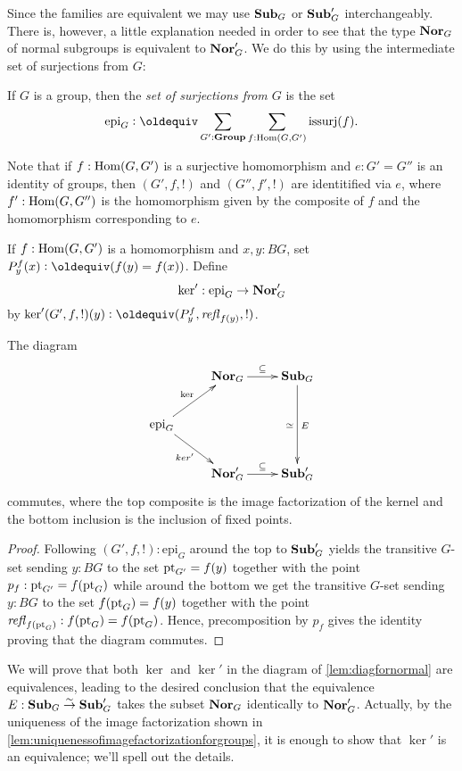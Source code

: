 Since the families are equivalent we may use $\mathbf{Sub}_G$ or $\mathbf{Sub}_G'$ interchangeably.  
There is, however, a little explanation needed in order to see that the type $\mathbf{Nor}_G$ of normal subgroups is equivalent to $\mathbf{Nor}'_G$.
We do this by using the intermediate set of surjections from $G$:
\newcommand{\epi}{\mathrm{epi}}
\begin{definition}
  \label{def:typeepi}
  If $G$ is a group, then the \emph{set of surjections from $G$} is the set
$$\epi_G\defequi\sum_{G':\typegroup}\sum_{f:\Hom(G,G')}\mathrm{issurj}(f).$$
\end{definition}
Note that if $f:\mathrm{Hom}(G,G')$ is a surjective homomorphism and $e:G'=G''$ is an identity of groups, then $(G',f,!)$ and $(G'',f',!)$ are identitified via $e$, where $f':\mathrm{Hom}(G,G'')$ is the homomorphism given by the composite of $f$ and the homomorphism corresponding to $e$.

\begin{definition}
  \label{def:ker2}
  If $f:\mathrm{Hom}(G,G')$ is a homomorphism and $x,y:BG$, set $P^f_y(x)\defequi (f(y)=f(x))$.
  Define $$\ker':\epi_G\to\typenormal_G'$$
  by $\ker'(G',f,!)(y)\defequi(P^f_y,\refl{f(y)},!)$.
\end{definition}

\begin{lemma}
  \label{lem:diagfornormal}
  The diagram
  $$\xymatrix{
  &\typenormal_G\ar[r]^{\subseteq}&\typesubgroup_G\ar[dd]_{\simeq}^{E}\\
  \epi_G\ar[ur]^{\ker}\ar[dr]_{ker'}&&\\
  &\typenormal_G'\ar[r]^{\subseteq}&\typesubgroup_G'}
$$
commutes, where the top composite is the image factorization of the kernel and the bottom inclusion is the inclusion of fixed points.
\end{lemma}
\begin{proof}
  Following $(G',f,!):\epi_G$ around the top to $\mathbf{Sub}_G'$ yields the transitive $G$-set sending $y:BG$ to the set $\mathrm{pt}_{G'}=f(y)$ together with the point $p_f:\mathrm{pt}_{G'}=f(\mathrm{pt}_G)$ while around the bottom we get the transitive $G$-set sending $y:BG$ to the set $f(\mathrm{pt}_G)=f(y)$ together with the point $\mathop{\mathit{refl}_{f(\mathrm{pt}_G)}}:f(\mathrm{pt}_G)=f(\mathrm{pt}_G)$.  Hence, precomposition by $p_f$ gives the identity proving that the diagram commutes. 
\end{proof}
We will prove that both $\ker$ and $\ker'$ in the diagram of \cref{lem:diagfornormal} are equivalences, leading to the desired conclusion that the equivalence $E:\mathbf{Sub}_G\overset\sim\to\mathbf{Sub}_G'$ takes the subset $\mathbf{Nor}_G$ identically to $\mathbf{Nor}_G'$.  Actually, by the uniqueness of the image factorization shown in \cref{lem:uniquenessofimagefactorizationforgroups}, it is enough to show that $\ker'$ is an equivalence; we'll spell out the details.

